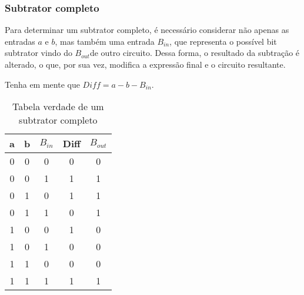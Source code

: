 \begin{frame}
	\frametitle{Subtrator completo}
	\par Para determinar um subtrator completo, é necessário considerar não apenas as entradas $a$ e $b$, mas também uma entrada $B_{in}$​, que representa o possível bit subtrator vindo do $B_{out}$​ de outro circuito. Dessa forma, o resultado da subtração é alterado, o que, por sua vez, modifica a expressão final e o circuito resultante.
	\par Tenha em mente que $Diff = a-b-B_{in}$.
	\begin{table}[h!]
		\centering
		\begin{tabular}{|c|c|c|c|c|}
			\hline
			a & b & $B_{in}$ & Diff & $B_{out}$ \\
			\hline
			0 & 0 & 0 & 0 & 0 \\
			0 & 0 & 1 & 1 & 1 \\
			0 & 1 & 0 & 1 & 1 \\
			0 & 1 & 1 & 0 & 1 \\
			1 & 0 & 0 & 1 & 0 \\
			1 & 0 & 1 & 0 & 0 \\
			1 & 1 & 0 & 0 & 0 \\
			1 & 1 & 1 & 1 & 1 \\
			\hline
		\end{tabular}
		\caption{Tabela verdade de um subtrator completo}
		\label{tab:full_subtractor}
	\end{table}
\end{frame}

